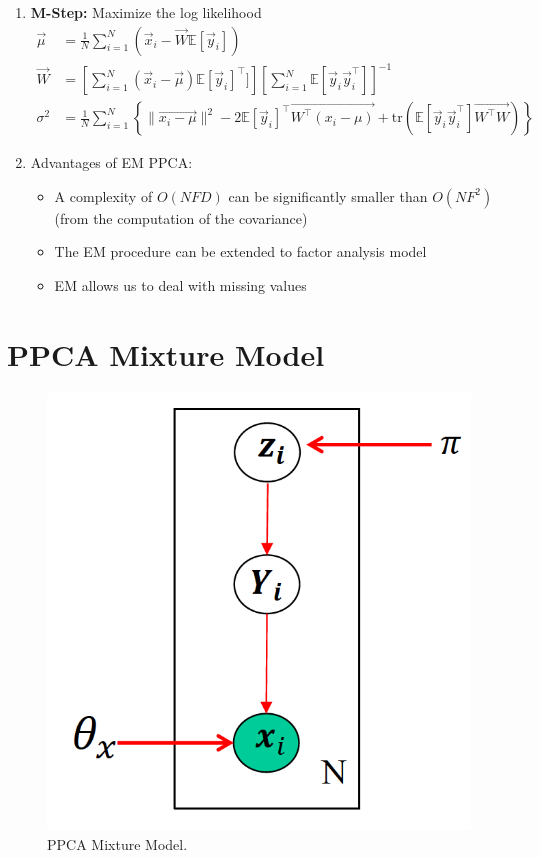 \documentclass[12pt,twoside]{article}
\begin{document}
\begin{enumerate}
\item \textbf{M-Step:} Maximize the log likelihood
\begin{align*}
\vec{\mu}&= \frac{1}{N}\sum_{i=1}^N(\vec{x}_i - \vec{W}\mathbb{E}[\vec{y}_i])\\
\vec{W}&=\left[\sum_{i=1}^N (\vec{x}_i - \vec{\mu})\mathbb{E}[\vec{y}_i]^\top]\right]\left[\sum_{i=1}^N \mathbb{E}[\vec{y}_i\vec{y}_i^\top]\right]^{-1}\\
\sigma^2&=\frac{1}{N}\sum_{i=1}^N\left\lbrace \parallel \vec{x_i-\mu} \parallel^2 -2\mathbb{E}[\vec{y}_i]^\top\vec{W^\top (x_i-\mu)} +\text{tr}(\mathbb{E}[\vec{y}_i\vec{y}_i^\top]\vec{W^\top W})\right\rbrace
\end{align*}


\item Advantages of EM PPCA:
\begin{itemize}
\item A complexity of $O(NFD)$ can be significantly smaller than $O(NF^2)$ (from the computation of the covariance)
\item The EM procedure can be extended to factor analysis model
\item EM allows us to deal with missing values
\end{itemize}

\end{enumerate}

\newpage

\section{PPCA Mixture Model}

\begin{figure}[H]
\begin{center}
\includegraphics[width = 0.4\hsize]{./figures/PPCAMixture.png} %
\caption{PPCA Mixture Model.} %
\label{fig:PPCA Mixture Model} %
\end{center}
\end{figure}
\end{document}
